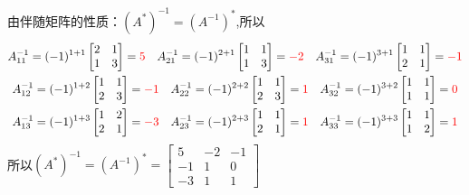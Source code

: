 \documentclass{article}
\begin{document}
\begin{jie}
由伴随矩阵的性质：$(A^{*})^{-1}=(A^{-1})^*$,所以
\begin{gather*}
A^{-1}_{11}=(-1)^{1+1}\begin{bmatrix}
 2 & 1 \\
 1 & 3
\end{bmatrix}=\textcolor[rgb]{1.00,0.00,0.00}{5}~~~A^{-1}_{21}=(-1)^{2+1}\begin{bmatrix}
 1 & 1 \\
 1 & 3
\end{bmatrix}=\textcolor[rgb]{1.00,0.00,0.00}{-2}~~~A^{-1}_{31}=(-1)^{3+1}\begin{bmatrix}
 1 & 1 \\
 2 & 1
\end{bmatrix}=\textcolor[rgb]{1.00,0.00,0.00}{-1}\\
A^{-1}_{12}=(-1)^{1+2}\begin{bmatrix}
 1 & 1 \\
 2 & 3
\end{bmatrix}=\textcolor[rgb]{1.00,0.00,0.00}{-1}~~~A^{-1}_{22}=(-1)^{2+2}\begin{bmatrix}
 1 & 1 \\
 2 & 3
\end{bmatrix}=\textcolor[rgb]{1.00,0.00,0.00}{1}~~~A^{-1}_{32}=(-1)^{3+2}\begin{bmatrix}
 1 & 1 \\
 1 & 1
\end{bmatrix}=\textcolor[rgb]{1.00,0.00,0.00}{0}\\
A^{-1}_{13}=(-1)^{1+3}\begin{bmatrix}
  1 & 2\\
 2 & 1 
\end{bmatrix}=\textcolor[rgb]{1.00,0.00,0.00}{-3}~~~A^{-1}_{23}=(-1)^{2+3}\begin{bmatrix}
 1 & 1 \\
 2 & 1
\end{bmatrix}=\textcolor[rgb]{1.00,0.00,0.00}{1}~~~A^{-1}_{33}=(-1)^{3+3}\begin{bmatrix}
 1 & 1 \\
 1 & 2
\end{bmatrix}=\textcolor[rgb]{1.00,0.00,0.00}{1}
\end{gather*}
所以$(A^{*})^{-1}=(A^{-1})^*=
\begin{bmatrix}
  5 & -2 & -1\\
  -1 & 1 & 0\\
  -3 & 1 & 1
\end{bmatrix}
$
\end{jie}
\end{document}

